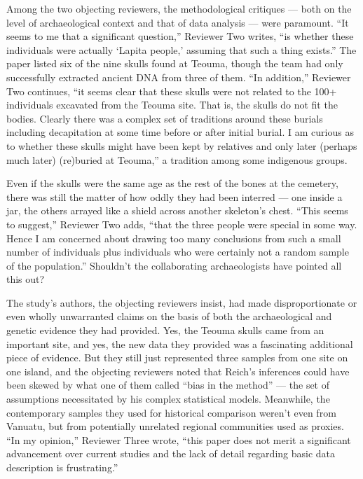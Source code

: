 Among the two objecting reviewers, the methodological critiques --- both
on the level of archaeological context and that of data analysis ---
were paramount. ``It seems to me that a significant question,'' Reviewer
Two writes, ``is whether these individuals were actually `Lapita
people,' assuming that such a thing exists.'' The paper listed six of
the nine skulls found at Teouma, though the team had only successfully
extracted ancient DNA from three of them. ``In addition,'' Reviewer Two
continues, ``it seems clear that these skulls were not related to the
100+ individuals excavated from the Teouma site. That is, the skulls do
not fit the bodies. Clearly there was a complex set of traditions around
these burials including decapitation at some time before or after
initial burial. I am curious as to whether these skulls might have been
kept by relatives and only later (perhaps much later) (re)buried at
Teouma,'' a tradition among some indigenous groups.

Even if the skulls were the same age as the rest of the bones at the
cemetery, there was still the matter of how oddly they had been interred
--- one inside a jar, the others arrayed like a shield across another
skeleton's chest. ``This seems to suggest,'' Reviewer Two adds, ``that
the three people were special in some way. Hence I am concerned about
drawing too many conclusions from such a small number of individuals
plus individuals who were certainly not a random sample of the
population.'' Shouldn't the collaborating archaeologists have pointed
all this out?

The study's authors, the objecting reviewers insist, had made
disproportionate or even wholly unwarranted claims on the basis of both
the archaeological and genetic evidence they had provided. Yes, the
Teouma skulls came from an important site, and yes, the new data they
provided was a fascinating additional piece of evidence. But they still
just represented three samples from one site on one island, and the
objecting reviewers noted that Reich's inferences could have been skewed
by what one of them called ``bias in the method'' --- the set of
assumptions necessitated by his complex statistical models. Meanwhile,
the contemporary samples they used for historical comparison weren't
even from Vanuatu, but from potentially unrelated regional communities
used as proxies. ``In my opinion,'' Reviewer Three wrote, ``this paper
does not merit a significant advancement over current studies and the
lack of detail regarding basic data description is frustrating.''

